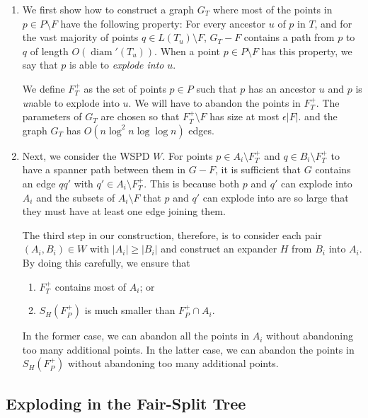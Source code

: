 \documentclass{patmorin}
\DeclareMathOperator{\diam}{diam}
\begin{document}
\begin{enumerate}
  \item We first show how to construct a graph $G_T$ where most of the
  points in $p\in P\setminus F$ have the following property: For every
  ancestor $u$ of $p$ in $T$, and for the vast majority of points $q\in
  L(T_u)\setminus F$, $G_T-F$ contains a path from $p$ to $q$ of length
  $O(\diam'(T_u))$.  When a point $p\in P\setminus F$ has this property,
  we say that $p$ is able to \emph{explode into} $u$.

  We define $F^+_T$ as the set of points $p\in P$ such that $p$ has an
  ancestor $u$ and $p$ is \emph{un}able to explode into $u$.  We will
  have to abandon the points in $F^+_T$.  The parameters of $G_T$ are
  chosen so that $F^+_T\setminus F$ has size at most $\epsilon|F|$.
  and the graph $G_T$ has $O(n\log^2 n\log\log n)$ edges.

   \item Next, we consider the WSPD $W$. For points $p\in A_i\setminus
   F^+_T$ and $q\in B_i\setminus F^+_T$ to have a spanner path between
   them in $G-F$, it is sufficient that $G$ contains an edge $qq'$
   with $q'\in A_i\setminus F^+_T$.  This is because both $p$ and $q'$
   can explode into $A_i$ and the subsets of $A_i\setminus F$ that $p$
   and $q'$ can explode into are so large that they must have at least
   one edge joining them.

   The third step in our construction, therefore, is to consider each pair
   $(A_i,B_i)\in W$ with $|A_i|\ge |B_i|$ and construct an expander $H$
   from $B_i$ into $A_i$.  By doing this carefully, we ensure that
  \begin{enumerate}
     \item $F^+_T$ contains most of $A_i$; or
     \item $S_{H}(F^+_P)$ is much smaller than $F^+_P\cap A_i$.
  \end{enumerate}
  In the former case, we can abandon all the points in $A_i$ without
  abandoning too many additional points. In the latter case, we can
  abandon the points in $S_{H}(F^+_P)$ without abandoning too many additional 
  points.
\end{enumerate}



\subsection{Exploding in the Fair-Split Tree}
\end{document}
